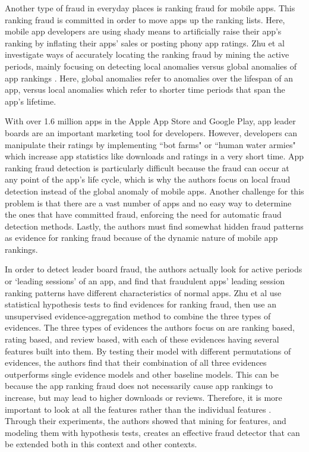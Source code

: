 \documentclass[midd]{thesis}
\begin{document}
Another type of fraud in everyday places is ranking fraud for mobile apps. This ranking fraud is committed in order to move apps up the ranking lists. Here, mobile app developers are using shady means to artificially raise their app's ranking by inflating their apps' sales or posting phony app ratings. Zhu et al investigate ways of accurately locating the ranking fraud by mining the active periods, mainly focusing on detecting local anomalies versus global anomalies of app rankings \cite{Zhu2015}. Here, global anomalies refer to anomalies over the lifespan of an app, versus local anomalies which refer to shorter time periods that span the app's lifetime. 

With over 1.6 million apps in the Apple App Store and Google Play, app leader boards are an important marketing tool for developers. However, developers can manipulate their ratings by implementing ``bot farms" or ``human water armies" which increase app statistics like downloads and ratings in a very short time. App ranking fraud detection is particularly difficult because the fraud can occur at any point of the app's life cycle, which is why the authors focus on local fraud detection instead of the global anomaly of mobile apps. Another challenge for this problem is that there are a vast number of apps and no easy way to determine the ones that have committed fraud, enforcing the need for automatic fraud detection methods. Lastly, the authors must find somewhat hidden fraud patterns as evidence for ranking fraud because of the dynamic nature of mobile app rankings.

In order to detect leader board fraud, the authors actually look for active periods or `leading sessions' of an app, and find that fraudulent apps' leading session ranking patterns have different characteristics of normal apps. Zhu et al use statistical hypothesis tests to find evidences for ranking fraud, then use an unsupervised evidence-aggregation method to combine the three types of evidences. The three types of evidences the authors focus on are ranking based, rating based, and review based, with each of these evidences having several features built into them. By testing their model with different permutations of evidences, the authors find that their combination of all three evidences outperforms single evidence models and other baseline models. This can be because the app ranking fraud does not necessarily cause app rankings to increase, but may lead to higher downloads or reviews. Therefore, it is more important to look at all the features rather than the individual features \cite{Zhu2015}. Through their experiments, the authors showed that mining for features, and modeling them with hypothesis tests, creates an effective fraud detector that can be extended both in this context and other contexts. 
\end{document}
